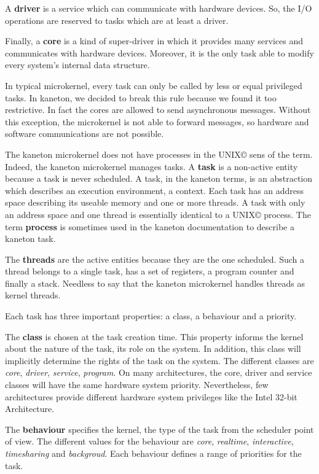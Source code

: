 \begin{multicols}{2}
A \textbf{driver} is a service which can communicate with hardware devices.
So, the I/O operations are reserved to tasks which are at least a driver.

Finally, a \textbf{core} is a kind of super-driver in which it provides
many services and communicates with hardware devices. Moreover, it is
the only task able to modify every system's internal data structure.

In typical microkernel, every task can only be called by less or equal
privileged tasks. In kaneton, we decided to break this rule because we found
it too restrictive. In fact the cores are allowed to send asynchronous
messages. Without this exception, the microkernel is not able to forward
messages, so hardware and software communications are not possible.

The kaneton microkernel does not have processes in the
UNIX{\scriptsize \copyright} sens of the term. Indeed, the kaneton
microkernel manages tasks. A \textbf{task} is a non-active entity because
a task is never scheduled. A task, in the kaneton terms, is an abstraction
which describes an execution environment, a context. Each task has an
address space describing its useable memory and one or more threads.
A task with only an address space and one thread is essentially identical
to a UNIX{\scriptsize \copyright} process. The term \textbf{process} is
sometimes used in the kaneton documentation to describe a kaneton task.

The \textbf{threads} are the active entities because they are the one
scheduled. Such a thread belongs to a single task, has a set of registers,
a program counter and finally a stack. Needless to say that the kaneton
microkernel handles threads as kernel threads.

Each task has three important properties: a class, a behaviour and a priority.

The \textbf{class} is chosen at the task creation time. This property
informs the kernel about the nature of the task, its role on the system.
In addition, this class will implicitly determine the rights of the task
on the system. The different classes are \textit{core}, \textit{driver},
\textit{service}, \textit{program}. On many architectures, the core, driver
and service classes will have the same hardware system priority.
Nevertheless, few architectures provide different hardware system privileges
like the Intel 32-bit Architecture.

The \textbf{behaviour} specifies the kernel, the type of the task from the
scheduler point of view. The different values for the behaviour are
\textit{core}, \textit{realtime}, \textit{interactive}, \textit{timesharing}
and \textit{backgroud}. Each behaviour defines a range of priorities for the
task.


\end{multicols}
